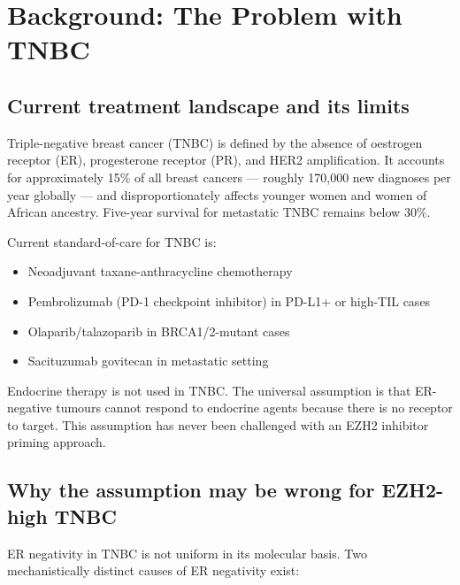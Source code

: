 \documentclass[12pt, a4paper]{article}
\begin{document}
\section{Background: The Problem with TNBC}

\subsection{Current treatment landscape and its limits}

Triple-negative breast cancer (TNBC) is defined by the
absence of oestrogen receptor (ER), progesterone receptor
(PR), and HER2 amplification. It accounts for approximately
15\% of all breast cancers --- roughly 170,000 new diagnoses
per year globally --- and disproportionately affects younger
women and women of African ancestry. Five-year survival for
metastatic TNBC remains below 30\%.

Current standard-of-care for TNBC is:
\begin{itemize}[noitemsep]
  \item Neoadjuvant taxane-anthracycline chemotherapy
  \item Pembrolizumab (PD-1 checkpoint inhibitor) in
        PD-L1+ or high-TIL cases
  \item Olaparib/talazoparib in BRCA1/2-mutant cases
  \item Sacituzumab govitecan in metastatic setting
\end{itemize}

Endocrine therapy is not used in TNBC. The universal
assumption is that ER-negative tumours cannot respond to
endocrine agents because there is no receptor to target.
This assumption has never been challenged with an EZH2
inhibitor priming approach.

\subsection{Why the assumption may be wrong for EZH2-high TNBC}

ER negativity in TNBC is not uniform in its molecular basis.
Two mechanistically distinct causes of ER negativity exist:
\end{document}
